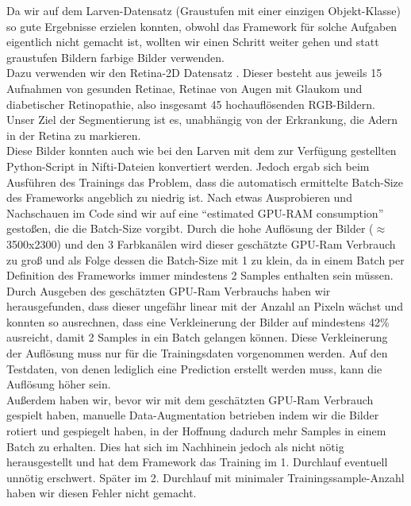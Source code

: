 Da wir auf dem Larven-Datensatz (Graustufen mit einer einzigen Objekt-Klasse) so gute Ergebnisse erzielen konnten, obwohl das Framework für solche Aufgaben eigentlich nicht gemacht ist, wollten wir einen Schritt weiter gehen und statt graustufen Bildern farbige Bilder verwenden.\\
Dazu verwenden wir den Retina-2D Datensatz \cite{retina2d}. Dieser besteht aus jeweils 15 Aufnahmen von gesunden Retinae, Retinae von Augen mit Glaukom und diabetischer Retinopathie, also insgesamt 45 hochauflösenden RGB-Bildern. Unser Ziel der Segmentierung ist es, unabhängig von der Erkrankung, die Adern in der Retina zu markieren.\\
Diese Bilder konnten auch wie bei den Larven mit dem zur Verfügung gestellten Python-Script \cite{nnunetGithub2D-Pythonscript} in Nifti-Dateien konvertiert werden. Jedoch ergab sich beim Ausführen des Trainings das Problem, dass die automatisch ermittelte Batch-Size des Frameworks angeblich zu niedrig ist. Nach etwas Ausprobieren und Nachschauen im Code sind wir auf eine \enquote{estimated GPU-RAM consumption} \cite{nnunetGithub} gestoßen, die die Batch-Size vorgibt. Durch die hohe Auflösung der Bilder ($\approx$ 3500x2300) und den 3 Farbkanälen wird dieser geschätzte GPU-Ram Verbrauch zu groß und als Folge dessen die Batch-Size mit 1 zu klein, da in einem Batch per Definition des Frameworks immer mindestens 2 Samples enthalten sein müssen.\\
Durch Ausgeben des geschätzten GPU-Ram Verbrauchs haben wir herausgefunden, dass dieser ungefähr linear mit der Anzahl an Pixeln wächst und konnten so ausrechnen, dass eine Verkleinerung der Bilder auf mindestens 42\% ausreicht, damit 2 Samples in ein Batch gelangen können.
Diese Verkleinerung der Auflösung muss nur für die Trainingsdaten vorgenommen werden. Auf den Testdaten, von denen lediglich eine Prediction erstellt werden muss, kann die Auflösung höher sein.\\
Außerdem haben wir, bevor wir mit dem geschätzten GPU-Ram Verbrauch gespielt haben, manuelle Data-Augmentation betrieben indem wir die Bilder rotiert und gespiegelt haben, in der Hoffnung dadurch mehr Samples in einem Batch zu erhalten. Dies hat sich im Nachhinein jedoch als nicht nötig herausgestellt und hat dem Framework das Training im 1. Durchlauf eventuell unnötig erschwert. Später im 2. Durchlauf mit minimaler Trainingssample-Anzahl haben wir diesen Fehler nicht gemacht.


